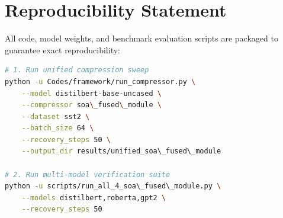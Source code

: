 \section{Reproducibility Statement}
All code, model weights, and benchmark evaluation scripts are packaged to guarantee exact reproducibility:
\begin{lstlisting}[language=bash]
# 1. Run unified compression sweep
python -u Codes/framework/run_compressor.py \
    --model distilbert-base-uncased \
    --compressor soa\_fused\_module \
    --dataset sst2 \
    --batch_size 64 \
    --recovery_steps 50 \
    --output_dir results/unified_soa\_fused\_module

# 2. Run multi-model verification suite
python -u scripts/run_all_4_soa\_fused\_module.py \
    --models distilbert,roberta,gpt2 \
    --recovery_steps 50
\end{lstlisting}
